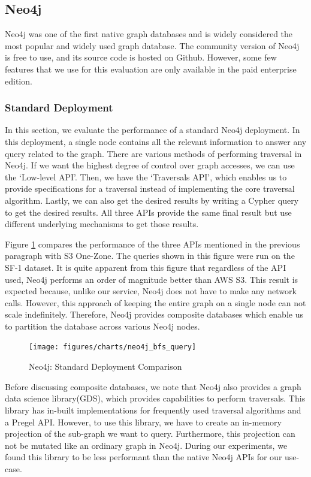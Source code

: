 \subsection{Neo4j}\label{sec:neo4jCmp}
Neo4j\cite{neo4j} was one of the first native graph databases and is widely
considered the most popular and widely used graph database. The community
version of Neo4j is free to use, and its source code is hosted on Github.
However, some few features that we use for this evaluation are only
available in the paid enterprise edition.

\subsubsection{Standard Deployment}
In this section, we evaluate the performance of a standard Neo4j deployment.
In this deployment, a single node contains all the relevant information to
answer any query related to the graph. There are various methods of performing
traversal in Neo4j. If we want the highest degree of control over graph
accesses, we can use the `Low-level API'. Then, we have the `Traversals API', which
enables us to provide specifications for a traversal instead of implementing the
core traversal algorithm. Lastly, we can also get the desired results by writing
a Cypher query to get the desired results. All three APIs provide the same final
result but use different underlying mechanisms to get those results.

\smallskip
Figure \ref{fig:neoStandardCmp} compares the performance of the three APIs
mentioned in the previous paragraph with S3 One-Zone. The queries shown in this
figure were run on the SF-1 dataset. It is quite apparent from this figure that
regardless of the API used, Neo4j performs an order of magnitude better than
AWS S3. This result is expected because, unlike our service, Neo4j does not have 
to make any network calls. However, this approach of keeping the entire graph on
a single node can not scale indefinitely. Therefore, Neo4j provides composite
databases which enable us to partition the database across various Neo4j nodes. 
\begin{figure}[ht]
    \centering
    \texttt{[image: figures/charts/neo4j\_bfs\_query]}
    \caption{Neo4j: Standard Deployment Comparison}
    \label{fig:neoStandardCmp}
\end{figure}

\smallskip
Before discussing composite databases, we note that Neo4j also provides a
graph data science library(GDS), which provides capabilities to perform traversals.
This library has in-built implementations for frequently used traversal algorithms and a
Pregel API. However, to use this library, we have to create an
in-memory projection of the sub-graph we want to query. Furthermore, this
projection can not be mutated like an ordinary graph in Neo4j. During our
experiments, we found this library to be less performant than the native Neo4j
APIs for our use-case.

